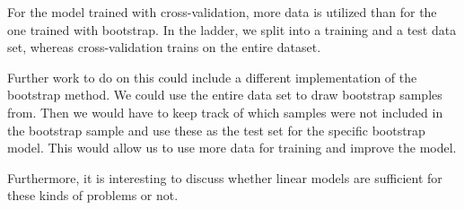 
For the model trained with cross-validation, more data is utilized than for the one trained with bootstrap. In the ladder, we split into a training and a test data set, whereas cross-validation trains on the entire dataset. 


Further work to do on this could include a different implementation of the bootstrap method. We could use the entire data set to draw bootstrap samples from. Then we would have to keep track of which samples were not included in the bootstrap sample and use these as the test set for the specific bootstrap model. This would allow us to use more data for training and improve the model. 

Furthermore, it is interesting to discuss whether linear models are sufficient for these kinds of problems or not. 